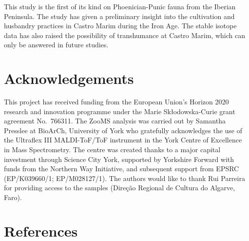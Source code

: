 \documentclass[preprint, 3p, authoryear]{elsarticle} %
\begin{document}
This study is the first of its kind on Phoenician-Punic fauna from the Iberian Peninsula. The study has given a preliminary insight into the cultivation and husbandry practices in Castro Marim during the Iron Age. The stable isotope data has also raised the possibility of transhumance at Castro Marim, which can only be answered in future studies.

\hypertarget{acknowledgements}{%
\section{Acknowledgements}\label{acknowledgements}}

This project has received funding from the European Union's Horizon 2020 research and innovation programme under the Marie Skłodowska-Curie grant agreement No.~766311. The ZooMS analysis was carried out by Samantha Presslee at BioArCh, University of York who gratefully acknowledges the use of the Ultraflex III MALDI-ToF/ToF instrument in the York Centre of Excellence in Mass Spectrometry. The centre was created thanks to a major capital investment through Science City York, supported by Yorkshire Forward with funds from the Northern Way Initiative, and subsequent support from EPSRC (EP/K039660/1; EP/M028127/1). The authors would like to thank Rui Parreira for providing access to the samples (Direção Regional de Cultura do Algarve, Faro).

\hypertarget{references}{%
\section*{References}\label{references}}
\end{document}

